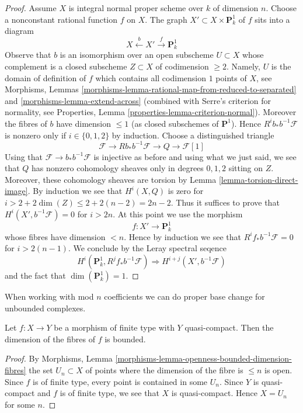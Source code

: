 \begin{proof}
\medskip\noindent
Assume $X$ is integral normal proper scheme over $k$ of dimension $n$.
Choose a nonconstant rational function $f$ on $X$. The graph
$X' \subset X \times \mathbf{P}^1_k$ of $f$ sits into a diagram
$$
X \xleftarrow{b} X' \xrightarrow{f} \mathbf{P}^1_k
$$
Observe that $b$ is an isomorphism over an open subscheme
$U \subset X$ whose complement is a closed subscheme
$Z \subset X$ of codimension $\geq 2$. Namely, $U$ is the
domain of definition of $f$ which contains all codimension $1$
points of $X$, see
Morphisms, Lemmas \ref{morphisms-lemma-rational-map-from-reduced-to-separated}
and \ref{morphisms-lemma-extend-across}
(combined with Serre's criterion for normality, see
Properties, Lemma \ref{properties-lemma-criterion-normal}).
Moreover the fibres of $b$ have dimension $\leq 1$ (as closed subschemes
of $\mathbf{P}^1$). Hence $R^ib_*b^{-1}\mathcal{F}$ is nonzero only
if $i \in \{0, 1, 2\}$ by induction. Choose a distinguished triangle
$$
\mathcal{F} \to Rb_*b^{-1}\mathcal{F} \to Q \to \mathcal{F}[1]
$$
Using that $\mathcal{F} \to b_*b^{-1}\mathcal{F}$ is injective
as before and using what we just said, we see that $Q$ has nonzero
cohomology sheaves only in degrees $0, 1, 2$ sitting on $Z$.
Moreover, these cohomology sheaves are torsion by
Lemma \ref{lemma-torsion-direct-image}.
By induction we see that $H^i(X, Q)$ is zero for
$i > 2 + 2\dim(Z) \leq 2 + 2(n - 2) = 2n - 2$. Thus it suffices
to prove that $H^i(X', b^{-1}\mathcal{F}) = 0$ for
$i > 2n$. At this point we use the morphism
$$
f : X' \to \mathbf{P}^1_k
$$
whose fibres have dimension $< n$. Hence by induction we see that
$R^if_*b^{-1}\mathcal{F} = 0$ for $i > 2(n - 1)$.
We conclude by the Leray spectral seqence
$$
H^i(\mathbf{P}^1_k, R^jf_*b^{-1}\mathcal{F})
\Rightarrow
H^{i + j}(X', b^{-1}\mathcal{F})
$$
and the fact that $\dim(\mathbf{P}^1_k) = 1$.
\end{proof}

\noindent
When working with mod $n$ coefficients we can do proper
base change for unbounded complexes.

\begin{lemma}
\label{lemma-morphism-finite-type-bounded-dimension}
Let $f : X \to Y$ be a morphism of finite type with $Y$ quasi-compact.
Then the dimension of the fibres of $f$ is bounded.
\end{lemma}

\begin{proof}
By Morphisms, Lemma \ref{morphisms-lemma-openness-bounded-dimension-fibres}
the set $U_n \subset X$ of points where the dimension of the fibre
is $\leq n$ is open. Since $f$ is of finite type, every point is
contained in some $U_n$. Since $Y$ is quasi-compact and $f$ is of
finite type, we see that $X$ is quasi-compact. Hence $X = U_n$ for
some $n$.
\end{proof}

